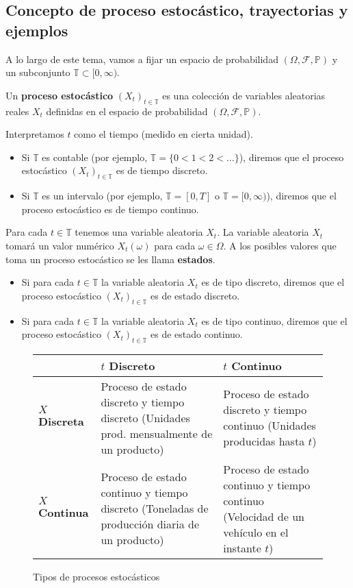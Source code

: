 \subsection{Concepto de proceso estocástico, trayectorias y ejemplos}
A lo largo de este tema, vamos a fijar un espacio de probabilidad $(\Omega, \mathcal{F}, \mathbb{P})$ y un subconjunto $\mathbb{T}\subset[0,\infty)$.
\begin{definition}
    Un \textbf{proceso estocástico} $(X_t)_{t\in \mathbb{T}}$ es una colección de variables aleatorias reales $X_t$ definidas en el espacio de probabilidad  $(\Omega, \mathcal{F}, \mathbb{P})$.
\end{definition}
Interpretamos $t$ como el tiempo (medido en cierta unidad).
 \begin{itemize}[label=\textbullet]
    \item Si $\mathbb{T}$ es contable (por ejemplo, $\mathbb{T}=\{0<1<2<\dots\} $), diremos que el proceso estocástico $(X_t)_{t\in \mathbb{T}}$ es de tiempo discreto.
    \item Si $\mathbb{T}$ es un intervalo (por ejemplo, $\mathbb{T}=[0,T]$ o $\mathbb{T}=[0,\infty)$), diremos que el proceso estocástico es de tiempo continuo.
\end{itemize}
Para cada $t\in \mathbb{T}$ tenemos una variable aleatoria $X_t$. La variable aleatoria  $X_t$ tomará un valor numérico  $X_t(\omega)$ para cada $\omega\in \Omega$. A los posibles valores que toma un proceso estocástico se les llama \textbf{estados}. 
\begin{itemize}[label=\textbullet]
    \item Si para cada $t\in \mathbb{T}$ la variable aleatoria $X_t$ es de tipo discreto, diremos que el proceso estocástico  $(X_t)_{t\in \mathbb{T}}$ es de estado discreto.
    \item Si para cada $t\in \mathbb{T}$ la variable aleatoria $X_t$ es de tipo continuo, diremos que el proceso estocástico  $(X_t)_{t\in \mathbb{T}}$ es de estado continuo.
\end{itemize}
\newpage
\begin{figure}[h]
    \centering
    \begin{tabular}{|m{2.5cm}|m{4cm}|m{4cm}|}
        \hline
         & $t$ \textbf{Discreto} & $t$  \textbf{Continuo} \\ \hline
    $X$ \textbf{Discreta} & Proceso de estado discreto y tiempo discreto (Unidades prod. mensualmente de un producto) & Proceso de estado discreto y tiempo continuo (Unidades producidas hasta $t$) \\ \hline
$X$ \textbf{Continua} & Proceso de estado continuo y tiempo discreto (Toneladas de producción diaria de un producto) & Proceso de estado continuo y tiempo continuo (Velocidad de un vehículo en el instante $t$) \\ \hline
    \end{tabular}
    \caption{Tipos de procesos estocásticos}
\end{figure}

